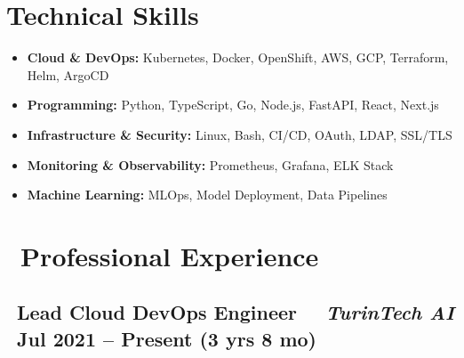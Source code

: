 \documentclass[a4paper,10pt]{article}
\begin{document}
\section*{ Technical Skills}
\begin{itemize}[left=0pt, label=]
    \item \textbf{Cloud \& DevOps:} Kubernetes, Docker, OpenShift, AWS, GCP, Terraform, Helm, ArgoCD
\end{itemize}
\begin{itemize}[left=0pt, label=]
    \item \textbf{Programming:} Python, TypeScript, Go, Node.js, FastAPI, React, Next.js
\end{itemize}
\begin{itemize}[left=0pt, label=]
    \item \textbf{Infrastructure \& Security:} Linux, Bash, CI/CD, OAuth, LDAP, SSL/TLS
\end{itemize}
\begin{itemize}[left=0pt, label=]
    \item \textbf{Monitoring \& Observability:} Prometheus, Grafana, ELK Stack
\end{itemize}
\begin{itemize}[left=0pt, label=]
    \item \textbf{Machine Learning:} MLOps, Model Deployment, Data Pipelines
\end{itemize}

\vspace{2pt}


\section*{\faBriefcase\ Professional Experience}

\vspace{6pt}

\subsection*{\faBriefcase\ \textbf{Lead Cloud DevOps Engineer} \textbar\ \faBuilding\ \textit{TurinTech AI}   \hfill \faCalendar\ Jul 2021 – Present (3 yrs 8 mo)}
\end{document}
